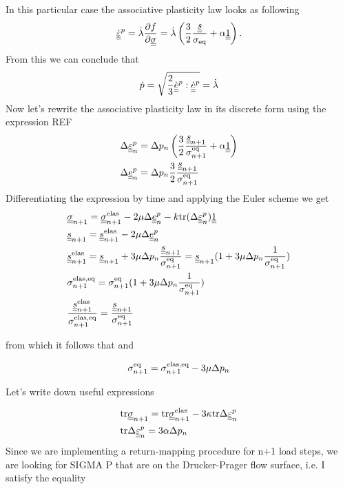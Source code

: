 \documentclass[12pt]{article}
\begin{document}
\begin{appendices}
    In this particular case the associative plasticity law looks as following
    \begin{equation}
        \dot{\underline{\underline{\varepsilon}}}^p = \dot{\lambda} \frac{\partial f}{\partial \underline{\underline{\sigma}}} = \dot{\lambda} \left(\frac{3}{2} \frac{\underline{\underline{s}}}{\sigma_\text{eq}} + \alpha \underline{\underline{1}} \right).
    \end{equation}
    From this we can conclude that 
    \begin{equation}
        \dot{p} = \sqrt{\frac{2}{3} \dot{\underline{\underline{e}}}^p : \dot{\underline{\underline{e}}}^p} = \dot{\lambda} 
    \end{equation}
    Now let's rewrite the associative plasticity law in its discrete form using the expression REF 
    \begin{align}
        & \Delta \underline{\underline{\varepsilon}}_{n}^p = \Delta p_n \left( \frac{3}{2} \frac{\underline{\underline{s}}_{n+1}}{\sigma_{n+1}^\text{eq}} + \alpha \underline{\underline{1}} \right) \\
        & \Delta \underline{\underline{e}}_{n}^p = \Delta p_n \frac{3}{2} \frac{\underline{\underline{s}}_{n+1}}{\sigma_{n+1}^\text{eq}} 
    \end{align}
    Differentiating the expression by time and applying the Euler scheme we get
    \begin{align}
        & \underline{\underline{\sigma}}_{n+1} = \underline{\underline{\sigma}}_{n+1}^\text{elas} - 2\mu \Delta \underline{\underline{e}}_{n}^p - k \mathrm{tr} (\Delta \underline{\underline{\varepsilon}}_{n}^p) \underline{\underline{1}} \\
        & \underline{\underline{s}}_{n+1} = \underline{\underline{s}}_{n+1}^\text{elas} - 2\mu\Delta \underline{\underline{e}}_{n}^p \\
        & \underline{\underline{s}}_{n+1}^\text{elas} = \underline{\underline{s}}_{n+1} + 3\mu\Delta p_n \frac{\underline{\underline{s}}_{n+1}}{\sigma_{n+1}^\text{eq}} = \underline{\underline{s}}_{n+1} (1 +  3\mu\Delta p_n \frac{1}{\sigma_{n+1}^\text{eq}}) \\
        & \sigma_{n+1}^\text{elas,eq} = \sigma_{n+1}^\text{eq} (1 +  3\mu\Delta p_n \frac{1}{\sigma_{n+1}^\text{eq}}) \\
        & \frac{\underline{\underline{s}}_{n+1}^\text{elas}}{\sigma_{n+1}^\text{elas,eq}} = \frac{\underline{\underline{s}}_{n+1}}{\sigma_{n+1}^\text{eq}}
    \end{align}
    
    from which it follows that
    and 

    \begin{equation}
        \sigma_{n+1}^\text{eq} = \sigma_{n+1}^\text{elas,eq} - 3\mu\Delta p_n 
    \end{equation}


    
    Let's write down useful expressions
    
    \begin{align}
        & \mathrm{tr} \underline{\underline{\sigma}}_{n+1} = \mathrm{tr} \underline{\underline{\sigma}}_{n+1}^{\text{elas}} - 3\kappa \mathrm{tr} \Delta \underline{\underline{\varepsilon}}_{n}^p \\
        & \mathrm{tr} \Delta \underline{\underline{\varepsilon}}_{n}^p = 3\alpha \Delta p_n
    \end{align}
    Since we are implementing a return-mapping procedure for n+1 load steps, we are looking for SIGMA P that are on the Drucker-Prager flow surface, i.e. I satisfy the equality 
    

\end{appendices}
\end{document}
